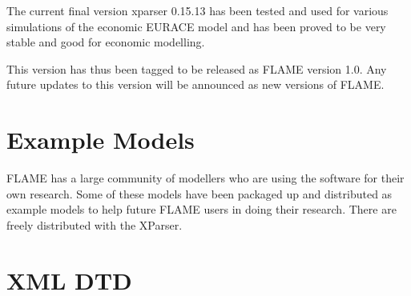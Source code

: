 \documentclass[a4paper,11pt]{article}
\begin{document}
The current final version xparser 0.15.13 has been tested and used for various simulations of the economic EURACE model and has been proved to be very stable and good for economic modelling.

This version has thus been tagged to be released as FLAME version 1.0. Any future updates to this version will be announced as new versions of FLAME.

\section{Example Models}
FLAME has a large community of modellers who are using the software
for their own research. Some of these models have been packaged up
and distributed as example models to help future FLAME users in
doing their research. There are freely distributed with the XParser.
%

\appendix

\section{XML DTD}
\label{cha_xmldtd}
\small{{\tt }}
%
%
%
%
%
%
%
%
\end{document}
